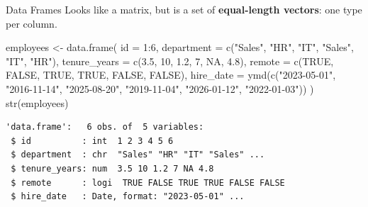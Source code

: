 \documentclass[
  ignorenonframetext,
  aspectratio=169,
]{beamer}
\newenvironment{Shaded}{\begin{snugshade}}{\end{snugshade}}
\newcommand{\AttributeTok}[1]{\textcolor[rgb]{0.40,0.45,0.13}{#1}}
\newcommand{\ConstantTok}[1]{\textcolor[rgb]{0.56,0.35,0.01}{#1}}
\newcommand{\DecValTok}[1]{\textcolor[rgb]{0.68,0.00,0.00}{#1}}
\newcommand{\FloatTok}[1]{\textcolor[rgb]{0.68,0.00,0.00}{#1}}
\newcommand{\FunctionTok}[1]{\textcolor[rgb]{0.28,0.35,0.67}{#1}}
\newcommand{\NormalTok}[1]{\textcolor[rgb]{0.00,0.23,0.31}{#1}}
\newcommand{\OtherTok}[1]{\textcolor[rgb]{0.00,0.23,0.31}{#1}}
\newcommand{\SpecialCharTok}[1]{\textcolor[rgb]{0.37,0.37,0.37}{#1}}
\newcommand{\StringTok}[1]{\textcolor[rgb]{0.13,0.47,0.30}{#1}}
\begin{document}
\begin{frame}[fragile]{Data Frames}
\protect\hypertarget{sec-dataframes}{}
Looks like a matrix, but is a set of \textbf{equal-length vectors}: one
type per column.

\begin{Shaded}
\begin{Highlighting}[]
\NormalTok{employees }\OtherTok{\textless{}{-}} \FunctionTok{data.frame}\NormalTok{(}
  \AttributeTok{id           =} \DecValTok{1}\SpecialCharTok{:}\DecValTok{6}\NormalTok{,}
  \AttributeTok{department   =} \FunctionTok{c}\NormalTok{(}\StringTok{"Sales"}\NormalTok{, }\StringTok{"HR"}\NormalTok{, }\StringTok{"IT"}\NormalTok{, }\StringTok{"Sales"}\NormalTok{, }\StringTok{"IT"}\NormalTok{, }\StringTok{"HR"}\NormalTok{),}
  \AttributeTok{tenure\_years =} \FunctionTok{c}\NormalTok{(}\FloatTok{3.5}\NormalTok{, }\DecValTok{10}\NormalTok{, }\FloatTok{1.2}\NormalTok{, }\DecValTok{7}\NormalTok{, }\ConstantTok{NA}\NormalTok{, }\FloatTok{4.8}\NormalTok{),}
  \AttributeTok{remote       =} \FunctionTok{c}\NormalTok{(}\ConstantTok{TRUE}\NormalTok{, }\ConstantTok{FALSE}\NormalTok{, }\ConstantTok{TRUE}\NormalTok{, }\ConstantTok{TRUE}\NormalTok{, }\ConstantTok{FALSE}\NormalTok{, }\ConstantTok{FALSE}\NormalTok{),}
  \AttributeTok{hire\_date    =} \FunctionTok{ymd}\NormalTok{(}\FunctionTok{c}\NormalTok{(}\StringTok{"2023{-}05{-}01"}\NormalTok{, }\StringTok{"2016{-}11{-}14"}\NormalTok{, }\StringTok{"2025{-}08{-}20"}\NormalTok{,}
                       \StringTok{"2019{-}11{-}04"}\NormalTok{, }\StringTok{"2026{-}01{-}12"}\NormalTok{, }\StringTok{"2022{-}01{-}03"}\NormalTok{))}
\NormalTok{)}
\FunctionTok{str}\NormalTok{(employees)}
\end{Highlighting}
\end{Shaded}

\begin{verbatim}
'data.frame':   6 obs. of  5 variables:
 $ id          : int  1 2 3 4 5 6
 $ department  : chr  "Sales" "HR" "IT" "Sales" ...
 $ tenure_years: num  3.5 10 1.2 7 NA 4.8
 $ remote      : logi  TRUE FALSE TRUE TRUE FALSE FALSE
 $ hire_date   : Date, format: "2023-05-01" ...
\end{verbatim}
\end{frame}
\end{document}
